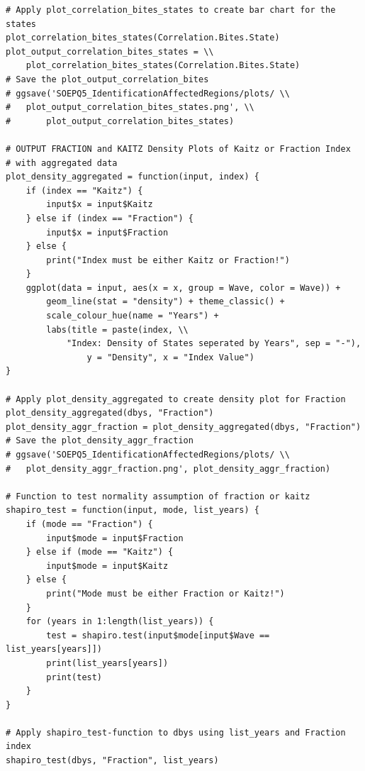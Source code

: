 \documentclass[a4paper]{article}
\begin{document}
{\begin{lstlisting}
# Apply plot_correlation_bites_states to create bar chart for the states
plot_correlation_bites_states(Correlation.Bites.State)
plot_output_correlation_bites_states = \\
	plot_correlation_bites_states(Correlation.Bites.State)
# Save the plot_output_correlation_bites 
# ggsave('SOEPQ5_IdentificationAffectedRegions/plots/ \\
#	plot_output_correlation_bites_states.png', \\
#    	plot_output_correlation_bites_states)

# OUTPUT FRACTION and KAITZ Density Plots of Kaitz or Fraction Index 
# with aggregated data
plot_density_aggregated = function(input, index) {
    if (index == "Kaitz") {
        input$x = input$Kaitz
    } else if (index == "Fraction") {
        input$x = input$Fraction
    } else {
        print("Index must be either Kaitz or Fraction!")
    }
    ggplot(data = input, aes(x = x, group = Wave, color = Wave)) + 
    	geom_line(stat = "density") + theme_classic() + 
        scale_colour_hue(name = "Years") + 
        labs(title = paste(index, \\ 
        	"Index: Density of States seperated by Years", sep = "-"), 
            	y = "Density", x = "Index Value")
}

# Apply plot_density_aggregated to create density plot for Fraction
plot_density_aggregated(dbys, "Fraction")
plot_density_aggr_fraction = plot_density_aggregated(dbys, "Fraction")
# Save the plot_density_aggr_fraction 
# ggsave('SOEPQ5_IdentificationAffectedRegions/plots/ \\
#	plot_density_aggr_fraction.png', plot_density_aggr_fraction)

# Function to test normality assumption of fraction or kaitz
shapiro_test = function(input, mode, list_years) {
    if (mode == "Fraction") {
        input$mode = input$Fraction
    } else if (mode == "Kaitz") {
        input$mode = input$Kaitz
    } else {
        print("Mode must be either Fraction or Kaitz!")
    }
    for (years in 1:length(list_years)) {
        test = shapiro.test(input$mode[input$Wave == list_years[years]])
        print(list_years[years])
        print(test)
    }
}

# Apply shapiro_test-function to dbys using list_years and Fraction index
shapiro_test(dbys, "Fraction", list_years)


\end{lstlisting}}
\end{document}
